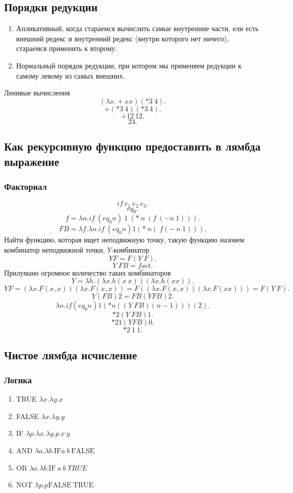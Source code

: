 \documentclass[14pt]{extarticle}
\begin{document}
\subsection{Порядки редукции}
\begin{enumerate}
    \item Апликативный, когда стараемся вычислить самые внутренние части, ели есть внешний редекс и внутренний редекс (внутри которого нет ничего), стараемся применить к второму.
    \item Нормальный порядок редукции,  при котором мы применяем редукции к самому левому из самых внешних.
\end{enumerate}
Ленивые вычисления
\[
    (\lambda x. + x x) (* 3~4)
.\] 
\[
+ (* 3~ 4) (* 3 ~4)
.\] 
\[
+ 12~12
.\] 
\[
24
.\] 
\subsection{Как рекурсивную функцию предоставить в  лямбда выражение}
\subsubsection{Факториал}
\[
if ~ e_1 ~ e_2 ~ e_3
.\] 
\[
eq_0
.\] 
\[
f =\lambda n. if ~ (eq_0 n)~1~(*~n~(f~(- n~1)))
.\] 
\[
FB = \lambda f. \lambda n . if ~ (eq_0 n) 1 (* ~ n (~ f (- ~ n ~ 1)))
.\] 
Найти функцию, которая ищет неподвижную точку, такую функцию назовем комбинатор неподвижной точки, $Y$-комбинатор
 \[
Y F = F(Y ~ F)
.\] 
\[
Y ~ FB =  fact
.\] 
Прилумано огромное количество таких комбинаторов\
\[
Y = \lambda h. (\lambda x . h (x ~ x)) (\lambda x.h (x x))
.\] 
\[
Y F = (\lambda x .F(x,x))(\lambda x . F(x,x)) = F ((\lambda x. F(x,x)) (\lambda x . F(x x))) = F(Y ~ F)
.\] 
\[
Y( FB) 2 = FB(Y FB) 2
.\] 
\[
\lambda n . if (eq_0 n ) 1 (* n ((Y ~FB) (n - 1)))(2)
.\] 
\[
* 2 (Y ~ FB) 1
.\] 
\[
* 2 1 (Y FB) 0
.\] 
\[
* 2 ~ 1 ~ 1
.\] 
\subsection{Чистое лямбда исчисление}
\subsubsection{Логика}
\begin{enumerate}
    \item TRUE $\lambda x . \lambda y . x$
    \item FALSE  $\lambda x . \lambda y . y$
    \item IF  $\lambda p . \lambda x . \lambda y . p~x~y$
    \item AND  $\lambda a . \lambda b. \text{IF} a~b~\text{FALSE}$
    \item OR  $\lambda a . \lambda b.  \text{IF} ~ a ~ b ~ TRUE$
    \item NOT  $\lambda p . p \text{FALSE} ~ \text{TRUE}$
\end{enumerate}
\end{document}

